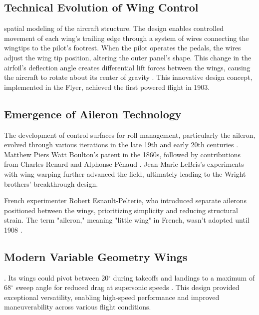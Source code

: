 \subsection{Technical Evolution of Wing Control}
 spatial modeling of the aircraft structure. The design enables controlled movement of each wing's trailing edge through a system of wires connecting the wingtips to the pilot's footrest. When the pilot operates the pedals, the wires adjust the wing tip position, altering the outer panel's shape. This change in the airfoil's deflection angle creates differential lift forces between the wings, causing the aircraft to rotate about its center of gravity \cite{nasa2023warping}. This innovative design concept, implemented in the Flyer, achieved the first powered flight in 1903.

\subsection{Emergence of Aileron Technology}
The development of control surfaces for roll management, particularly the aileron, evolved through various iterations in the late 19th and early 20th centuries \cite{crouch2008oldies}.  Matthew Piers Watt Boulton's patent in the 1860s, followed by contributions from Charles Renard and Alphonse Pénaud \cite{crouch2008oldies}. Jean-Marie LeBris's experiments with wing warping further advanced the field, ultimately leading to the Wright brothers' breakthrough design.

 French experimenter Robert Esnault-Pelterie, who introduced separate ailerons positioned between the wings, prioritizing simplicity and reducing structural strain. The term "aileron," meaning "little wing" in French, wasn't adopted until 1908 \cite{crouch2008oldies}. 

\subsection{Modern Variable Geometry Wings}
. Its wings could pivot between 20$^{\circ}$ during takeoffs and landings to a maximum of 68$^{\circ}$ sweep angle for reduced drag at supersonic speeds \cite{airforce2020f14}. This design provided exceptional versatility, enabling high-speed performance and improved maneuverability across various flight conditions.

